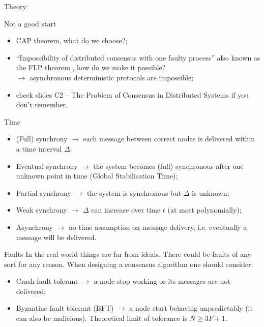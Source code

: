\documentclass[presentation]{beamer}\mode<presentation>{\usetheme{AMSBolognaFC}}
\begin{document}
\begin{frame}[allowframebreaks]{Theory}
    \begin{block}{Not a good start}
    	\begin{itemize}
            \item CAP theorem, what do we choose?;
    		\item ``Impossibility of distributed consensus with one faulty process'' also known as the FLP theorem \cite{FLP}, how do we make it possible?\\
            $\rightarrow$ asynchronous deterministic protocols are impossible;
            \item check slides C2 -- The Problem of Consensus in Distributed Systems if you don't remember.
    	\end{itemize}
    \end{block}

    \framebreak

    \begin{block}{Time}
    	\begin{itemize}
    		\item (Full) synchrony $\rightarrow$ each message between correct nodes is delivered within a time interval $\Delta$;
            \item Eventual synchrony $\rightarrow$ the system becomes (full) synchronous after one unknown point in time (Global Stabilisation Time);
            \item Partial synchrony $\rightarrow$ the system is synchronous but $\Delta$ is unknown;
            \item Weak synchrony $\rightarrow$ $\Delta$ can increase over time $t$ (at most polynomially);
            \item Asynchrony $\rightarrow$ no time assumption on message delivery, i.e. eventually a message will be delivered.
    	\end{itemize}
    \end{block}

    \framebreak

    \begin{block}{Faults}
        In the real world things are far from ideals.
        There could be faults of any sort for any reason.
        When designing a consensus algorithm one should consider:
        \begin{itemize}
            \item \alert{Crash} fault tolerant $\rightarrow$ a node stop working or its messages are not delivered;
            \item \alert{Byzantine} fault tolerant (BFT) $\rightarrow$ a node start behaving unpredictably (it can also be malicious).
            Theoretical limit of tolerance is $N \ge 3F + 1$.
        \end{itemize}
    \end{block}


\end{frame}
\end{document}
